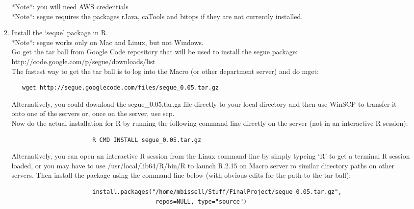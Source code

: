 \documentclass[a4paper, 11pt]{report}
\begin{document}
\begin{enumerate}
\begin{enumerate}
					*Note*: you will need AWS credentials \\
					
					*Note*: segue requires the packages rJava, caTools and bitops if they are not currently installed. \\
				
				\item Install the `seque' package in R. \\
				
					*Note*: segue works only on Mac and Linux, but not Windows. \\
					
					Go get the tar ball from Google Code repository that will be used to install the segue package: \\
					http://code.google.com/p/segue/downloads/list \\
					
					The fastest way to get the tar ball is to log into the Macro (or other department server) and do mget: 
					\footnotesize\begin{verbatim}   wget http://segue.googlecode.com/files/segue_0.05.tar.gz \end{verbatim}\normalsize 
					
					Alternatively, you could download the segue\_0.05.tar.gz file directly to your local directory and then use WinSCP to transfer it onto one of the servers or, once on the server, use scp. \\
					
					Now do the actual installation for R by running the following command line directly on the server (not in an interactive R session): 
					 
					\footnotesize\begin{verbatim}   
					   R CMD INSTALL segue_0.05.tar.gz 
					\end{verbatim}\normalsize 
					
					Alternatively, you can open an interactive R session from the Linux command line by simply typeing `R' to get a terminal R session loaded, or you may have to use /usr/local/lib64/R/bin/R to launch R.2.15 on Macro server ro similar directory paths on other servers.  Then install the package using the command line below (with obvious edits for the path to the tar ball): 
					
					\footnotesize\begin{verbatim}   
					   install.packages("/home/mbissell/Stuff/FinalProject/segue_0.05.tar.gz", 
					                     repos=NULL, type="source") 
					\end{verbatim}\normalsize
					

\end{enumerate}
\end{enumerate}
\end{document}
